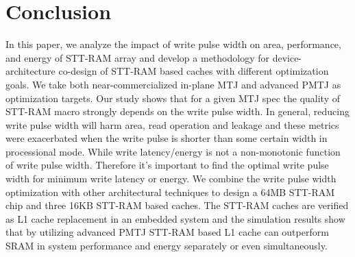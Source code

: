 \section{Conclusion} \label{sec:conclusion}

In this paper, we analyze the impact of write pulse width on area, performance, and energy of STT-RAM array and develop a methodology for device-architecture co-design of STT-RAM based caches with different optimization goals. We take both near-commercialized in-plane MTJ and advanced PMTJ as optimization targets. Our study shows that for a given MTJ spec the quality of STT-RAM macro strongly depends on the write pulse width. In general, reducing write pulse width will harm area, read operation and leakage and these metrics were exacerbated when the write pulse is shorter than some certain width in processional mode. While write latency/energy is not a non-monotonic function of write pulse width. Therefore it's important to find the optimal write pulse width for minimum write latency or energy. We combine the write pulse width optimization with other architectural techniques to design a 64MB STT-RAM chip and three 16KB STT-RAM based caches. The STT-RAM caches are verified as L1 cache replacement in an embedded system and the simulation results show that by utilizing advanced PMTJ STT-RAM based L1 cache can outperform SRAM in system performance and energy separately or even simultaneously. 
